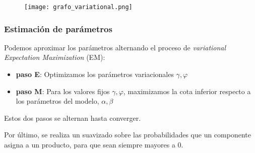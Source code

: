 \documentclass[class=article, crop=false]{standalone}
\begin{document}
\begin{figure}
\centering
\texttt{[image: grafo\_variational.png]}
\caption{\cite{blei2003latent}}
\end{figure}

\subsubsection{Estimación de parámetros}

Podemos aproximar los parámetros alternando el proceso de
\emph{variational Expectation Maximization} (EM):

\begin{itemize}
\item
\textbf{paso E}: Optimizamos los parámetros variacionales
\(\gamma, \varphi\)
\item
\textbf{paso M}: Para los valores fijos \(\gamma, \varphi\),
maximizamos la cota inferior respecto a los parámetros del modelo,
\(\alpha,\beta\)
\end{itemize}

Estos dos pasos se alternan hasta converger.

Por último, se realiza un suavizado sobre las probabilidades que un
componente asigna a un producto, para que sean siempre mayores a 0.






%
%
%
\end{document}

